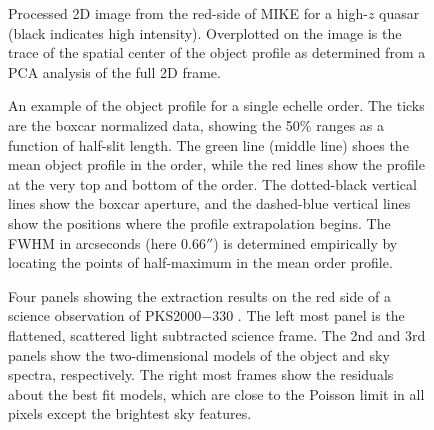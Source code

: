 \documentclass[12pt,preprint]{aastex}
\begin{document}
\begin{figure}
\caption{Processed 2D image from the red-side of MIKE for a high-$z$ quasar
(black indicates high intensity).  Overplotted on the image is the trace
of the spatial center of the object profile as determined from a PCA
analysis of the full 2D frame.
}
\label{fig:trcobj}
\end{figure}

\clearpage

\begin{figure}
\caption{An example of the object profile for a single echelle order.  
The ticks
are the boxcar normalized data, showing the 50\% ranges as a function of
half-slit length.  The green line (middle line) shoes the mean
object profile in the order, while the red lines show the profile at the very
top and bottom of the order.
The dotted-black vertical lines show the boxcar aperture, and the 
dashed-blue vertical lines
show the positions where the profile extrapolation begins.  
The FWHM in arcseconds (here 0.66$''$) 
is determined empirically by locating the points of half-maximum in the 
mean order profile.
}
\label{fig:profile}
\end{figure}

\begin{figure}
\caption{Four panels showing the extraction results on the red side of a
science observation of PKS2000$-$330 \citep[see][]{ppo+10}.  The left most panel
is the flattened, scattered light subtracted science frame.  The 2nd and 3rd
panels show the two-dimensional models of the object and sky spectra, 
respectively.  The right most frames show the residuals about the best fit 
models, which are close to the Poisson limit in all pixels except the brightest
sky features. }
\label{fig:extract}
\end{figure}
\end{document}
